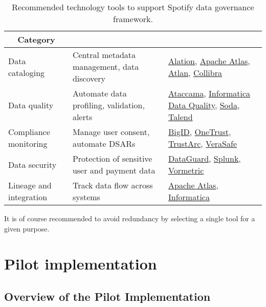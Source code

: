 \documentclass[11pt,a4paper,computermodern]{article}
\begin{document}
\begin{table}[h]
	\centering
	\begin{threeparttable}
		\caption{Recommended technology tools to support Spotify data governance framework.}
		\label{table:tools}
		\begin{tabularx}{0.99\textwidth}{l >{\arraybackslash}X >{\arraybackslash}X}
			\toprule
			\multicolumn{1}{c}{\textbf{Category}} & \multicolumn{1}{c}{\textbf{Purpose}} & \multicolumn{1}{c}{\textbf{Examples}} \\
			\midrule
			Data cataloging & Central metadata management, data discovery & \href{https://www.alation.com/}{Alation}, \href{https://atlas.apache.org/}{Apache Atlas}, \href{https://atlan.com/}{Atlan}, \href{https://www.collibra.com/}{Collibra} \\
			Data quality & Automate data profiling, validation, alerts & \href{https://www.ataccama.com/}{Ataccama}, \href{https://www.informatica.com/products/data-quality.html}{Informatica Data Quality}, \href{https://www.soda.io/}{Soda}, \href{https://www.talend.com/products/data-integrity-governance/}{Talend} \\
			Compliance monitoring & Manage user consent, automate DSARs & \href{https://bigid.com/}{BigID}, \href{https://www.onetrust.com/}{OneTrust}, \href{https://trustarc.com/}{TrustArc}, \href{https://verasafe.com/}{VeraSafe} \\
			Data security & Protection of sensitive user and payment data & \href{https://www.dataguard.com/}{DataGuard}, \href{https://www.splunk.com/}{Splunk}, \href{https://cpl.thalesgroup.com/encryption/vormetric-data-security-platform}{Vormetric} \\
			Lineage and integration & Track data flow across systems & \href{https://atlas.apache.org/}{Apache Atlas}, \href{https://www.informatica.com/products/data-quality.html}{Informatica} \\
			\bottomrule
		\end{tabularx}
	\end{threeparttable}
\end{table}

It is of course recommended to avoid redundancy by selecting a single tool for a given purpose.


\section*{Pilot implementation}

\subsection*{Overview of the Pilot Implementation}
\end{document}
